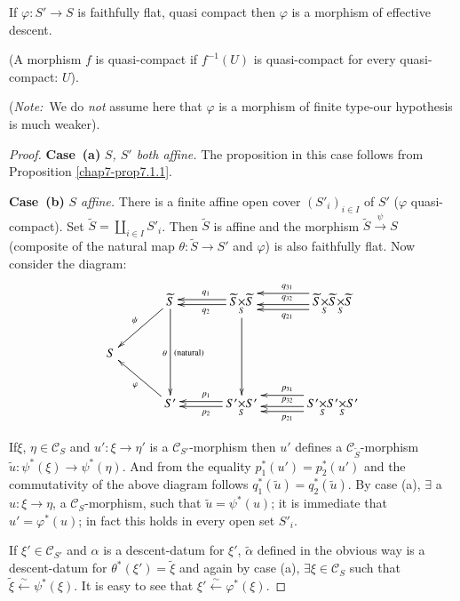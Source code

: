 \setcounter{prop}{3}
\begin{prop}\label{chap7-prop7.1.4}
If $\varphi:S'\to S$ is faithfully flat, quasi compact then $\varphi$
is a morphism of effective descent.
\end{prop}

(A morphism $f$ is quasi-compact if $f^{-1}(U)$ is quasi-compact for
every quasi-compact: $U$).

({\em Note:}~We do {\em not} assume here that $\varphi$ is a morphism
of finite type-our hypothesis is much weaker).

\begin{proof}
{\bf Case~(a)} {\em $S$, $S'$ both affine.} The proposition in
  this case follows from Proposition \ref{chap7-prop7.1.1}.

\medskip
\noindent

{\bf Case~(b)} {\em $S$ affine.} There is a finite affine open
  cover $(S'_{i})_{i\in I}$ of $S'$ ($\varphi$ quasi-compact). Set
  $\widetilde{S}=\coprod\limits_{i\in I}S'_{i}$. Then $\widetilde{S}$
  is affine and the morphism $\widetilde{S}\xrightarrow{\psi}S$
  (composite of the natural map $\theta:\widetilde{S}\to S'$ and
  $\varphi$) is also faithfully flat. Now consider the diagram:
\[
\xymatrix@C=1.2cm{
 & \widetilde{S}\ar[dl]_{\psi}\ar[dd]_{\theta}^{\text{(natural)}} &
  \fprod{\widetilde{S}}{\widetilde{S}}{S}
\ar@<-.2em>[l]_{q_{1}}\ar@<.2em>[l]^{q_{2}}\ar[dd]
  & \fprod{\widetilde{S}}{\fprod{\widetilde{S}}{\widetilde{S}}{S}}{S} 
\ar@<-.7em>[l]_{q_{31}}\ar@<.2em>[l]_{q_{32}}\ar@<.6em>[l]^{q_{21}}\\
S & & \\
& S'\ar[ul]^{\varphi} & \fprod{S'}{S'}{S}
\ar@<-.2em>[l]_{p_{1}}\ar@<.2em>[l]^{p_{2}} &
\fprod{S'}{\fprod{S'}{S'}{S}}{S} \ar@<-.7em>[l]_{p_{31}}\ar@<.2em>[l]_{p_{32}}\ar@<.6em>[l]^{p_{21}}
}
\]

If\pageoriginale $\xi$, $\eta\in\mathscr{C}_{S}$ and $u':\xi\to \eta'$
is a $\mathscr{C}_{S'}$-morphism then $u'$ defines a
$\mathscr{C}_{\widetilde{S}}$-morphism
$\widetilde{u}:\psi^{\ast}(\xi)\to \psi^{\ast}(\eta)$. And from the
equality $p^{\ast}_{1}(u')=p^{\ast}_{2}(u')$ and the commutativity of
the above diagram follows
$q^{\ast}_{1}(\widetilde{u})=q^{\ast}_{2}(\widetilde{u})$. By case
(a), $\exists$ a $u:\xi\to \eta$, a $\mathscr{C}_{S}$-morphism, such
that $\widetilde{u}=\psi^{\ast}(u)$; it is immediate that
$u'=\varphi^{\ast}(u)$; in fact this holds in every open set
$S'_{i}$. 

If $\xi'\in\mathscr{C}_{S'}$ and $\alpha$ is a descent-datum for
$\xi'$, $\widetilde{\alpha}$ defined in the obvious way is a
descent-datum for $\theta^{\ast}(\xi')=\widetilde{\xi}$ and again by
case (a), $\exists \xi\in\mathscr{C}_{S}$ such that
$\widetilde{\xi}\xleftarrow{\sim}\psi^{\ast}(\xi)$. It is easy to see
that $\xi'\xleftarrow{\sim}\varphi^{\ast}(\xi)$. 


\end{proof}
